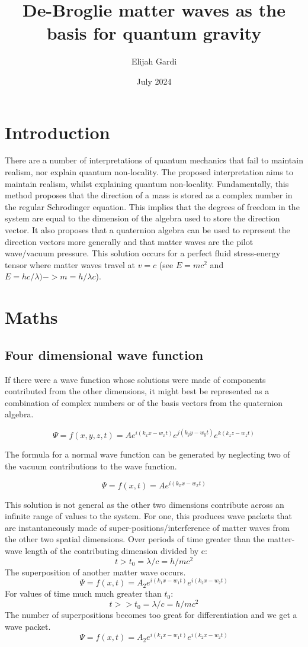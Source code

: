 \documentclass{article}
\title{De-Broglie matter waves as the basis for quantum gravity}
\author{Elijah Gardi}
\date{July 2024}
\begin{document}
\maketitle

\section{Introduction}
There are a number of interpretations of quantum mechanics that fail to maintain realism, nor explain quantum non-locality. The proposed interpretation aims to maintain realism, whilst explaining quantum non-locality. Fundamentally, this method proposes that the direction of a mass is stored as a complex number in the regular Schrodinger equation. This implies that the degrees of freedom in the system are equal to the dimension of the algebra used to store the direction vector. It also proposes that a quaternion algebra can be used to represent the direction vectors more generally and that matter waves are the pilot wave/vacuum pressure. This solution occurs for a perfect fluid stress-energy tensor where matter waves travel at $v=c$ (see $E=mc^2$ and $E=hc/\lambda) -> m=h/\lambda c$).

\section{Maths}
\subsection{Four dimensional wave function}

If there were a wave function whose solutions were made of components contributed from the other dimensions, it might best be represented as a combination of complex numbers or of the basis vectors from the quaternion algebra.

$$\Psi=f(x,y,z,t)=A e^{i(k_x x-w_x t)} e^{j(k_y y-w_y t)} e^{k(k_z z-w_z t)}$$

The formula for a normal wave function can be generated by neglecting two of the vacuum contributions to the wave function.

$$\Psi=f(x,t)=A e^{i(k_x x-w_x t)}$$

This solution is not general as the other two dimensions contribute across an infinite range of values to the system. For one, this produces wave packets that are instantaneously made of super-positions/interference of matter waves from the other two spatial dimensions. Over periods of time greater than the matter-wave length of the contributing dimension divided by c: 
$$t>t_0=\lambda /c=h/mc^2$$
The superposition of another matter wave occurs. 
$$\Psi=f(x,t)=A_2 e^{i(k_1 x-w_1 t)}e^{i(k_2 x-w_2 t)}$$
For values of time much much greater than $t_0$:
$$t>>t_0=\lambda /c=h/mc^2$$
The number of superpositions becomes too great for differentiation and we get a wave packet.
$$\Psi=f(x,t)=A_2 e^{i(k_1 x-w_1 t)}e^{i(k_2 x-w_2 t)}$$
\end{document}
